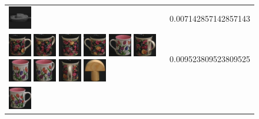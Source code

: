 {\begin{figure}[p]
\begin{tabular}{m{11cm} | m{3cm} |}
\includegraphics[width=1cm]{coil/beeld-25.eps}
& {\scriptsize 0.007142857142857143}
\\
\includegraphics[width=1cm]{coil/beeld-60.eps}
\includegraphics[width=1cm]{coil/beeld-63.eps}
\includegraphics[width=1cm]{coil/beeld-62.eps}
\includegraphics[width=1cm]{coil/beeld-61.eps}
\includegraphics[width=1cm]{coil/beeld-7.eps}
\includegraphics[width=1cm]{coil/beeld-64.eps}
\includegraphics[width=1cm]{coil/beeld-8.eps}
\includegraphics[width=1cm]{coil/beeld-9.eps}
\includegraphics[width=1cm]{coil/beeld-65.eps}
\includegraphics[width=1cm]{coil/beeld-0.eps}
& {\scriptsize 0.009523809523809525}
\\
\includegraphics[width=1cm]{coil/beeld-6.eps}

\end{tabular}
\end{figure}}
